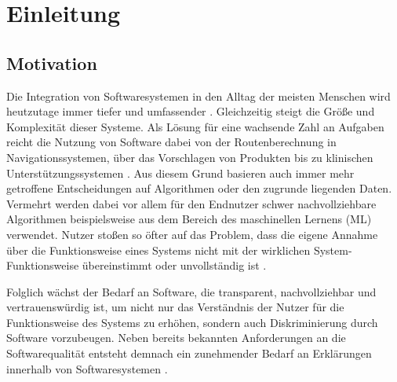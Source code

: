 \chapter{Einleitung}

\section{Motivation}

Die Integration von Softwaresystemen in den Alltag der meisten Menschen wird heutzutage immer tiefer und umfassender \cite{carvalho2020developers}.  Gleichzeitig steigt die Größe und Komplexität dieser Systeme. Als Lösung für eine wachsende Zahl an Aufgaben reicht die Nutzung von Software dabei von der Routenberechnung in Navigationssystemen, über das Vorschlagen von Produkten bis zu klinischen Unterstützungssystemen \cite{chazette2020explainability, tintarev2015explaining, cypko2017guide}. Aus diesem Grund basieren auch immer mehr getroffene Entscheidungen auf Algorithmen oder den zugrunde liegenden Daten. Vermehrt werden dabei vor allem für den Endnutzer schwer nachvollziehbare Algorithmen beispielsweise aus dem Bereich des maschinellen Lernens (ML) verwendet. Nutzer stoßen so öfter auf das Problem, dass die eigene Annahme über die Funktionsweise eines Systems nicht mit der wirklichen System-Funktionsweise übereinstimmt oder unvollständig ist \cite{chazette_knowledge_nodate}.

Folglich wächst der Bedarf an Software, die transparent, nachvollziehbar und vertrauenswürdig ist, um nicht nur das Verständnis der Nutzer für die Funktionsweise des Systems zu erhöhen, sondern auch Diskriminierung durch Software vorzubeugen. Neben bereits bekannten Anforderungen an die Softwarequalität \cite{international2011iso} entsteht demnach ein zunehmender Bedarf an Erklärungen innerhalb von Softwaresystemen \cite{chazette_end-users_nodate}.


